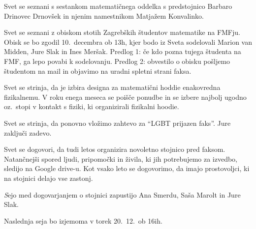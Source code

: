 \documentclass{seja}
\begin{document}
\begin{ad}
Svet se seznani s sestankom matematičnega oddelka s predstojnico Barbaro Drinovec Drnovšek in njenim namestnikom Matjažem Konvalinko.

\item
Svet se seznani z obiskom stotih Zagrebških študentov matematike na FMFju. Obisk
se bo zgodil 10.\ decembra ob 13h, kjer bodo iz Sveta sodelovali Marion van Midden, Jure Slak in Ines Meršak.
Predlog 1: če kdo pozna tujega študenta na FMF, ga lepo povabi k sodelovanju.
Predlog 2: obvestilo o obisku pošljemo študentom na mail in objavimo na uradni spletni strani faksa.

\item
Svet se strinja, da je izbira designa za matematični hoddie enakovredna fizikalnemu.
V roku enega meseca se poišče ponudbe in se izbere najbolj ugodno oz.\ stopi v kontakt
s fiziki, ki organizirali fizikalni hoodie.

\item
Svet se strinja, da ponovno vložimo zahtevo za ``LGBT prijazen faks''.
Jure zaključi zadevo.

\item
Svet se dogovori, da tudi letos organizira novoletno stojnico pred faksom.
Natančnejši spored ljudi, pripomočki in živila, ki jih potrebujemo za izvedbo,
sledijo na Google drive-u.
Kot vsako leto se dogovorimo, da imajo prostovoljci, ki na stojnici delajo vse zastonj.

\textit Sejo med dogovarjanjem o stojnici zapustijo Ana Smerdu, Saša Marolt in Jure Slak.

Naslednja seja bo izjemoma v torek 20.~12.~ob 16ih.
\end{ad}
\end{document}
